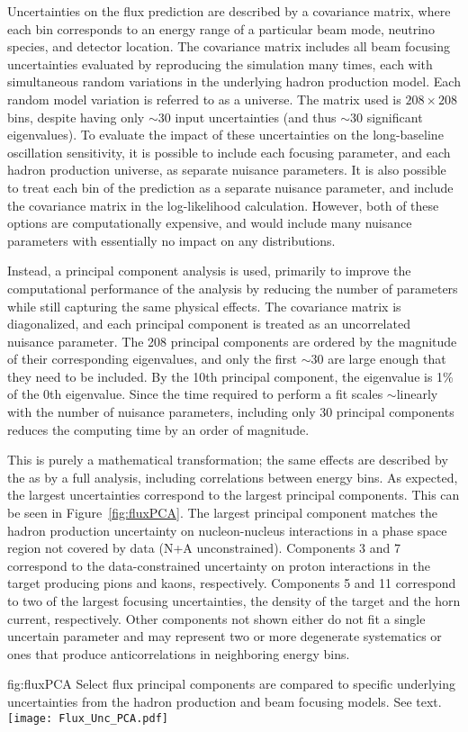 Uncertainties on the flux prediction are described by a covariance matrix, where each bin corresponds to an energy range of a particular beam mode, neutrino species, and detector location. The covariance matrix includes all beam focusing uncertainties evaluated by reproducing the simulation many times, each with simultaneous random variations in the underlying hadron production model. Each random model variation is referred to as a universe. The  matrix used is $208 \times 208$ bins, despite having only $\sim$30 input uncertainties (and thus $\sim$30 significant eigenvalues). To evaluate the impact of these uncertainties on the long-baseline oscillation sensitivity, it is possible to include each focusing parameter, and each hadron production universe, as separate nuisance parameters. It is also possible to treat each bin of the prediction as a separate nuisance parameter, and include the covariance matrix in the log-likelihood calculation. However, both of these options are computationally expensive, and would include many nuisance parameters with essentially no impact on any distributions.

Instead, a principal component analysis is used, primarily to improve the computational performance of the analysis by reducing the number of parameters while still capturing the same physical effects. The covariance matrix is diagonalized, and each principal component is treated as an uncorrelated nuisance parameter. The 208 principal components are ordered by the magnitude of their corresponding eigenvalues, and only the first $\sim$30 are large enough that they need to be included. By the 10th principal component, the eigenvalue is 1\% of the 0th eigenvalue. Since the time required to perform a fit scales $\sim$linearly with the number of nuisance parameters, including only 30 principal components reduces the computing time by an order of magnitude.

This is purely a mathematical transformation; the same effects are described by the  as by a full analysis, including correlations between energy bins. As expected, the largest uncertainties correspond to the largest principal components. This can be seen in Figure~\ref{fig:fluxPCA}. The largest principal component matches the hadron production uncertainty on nucleon-nucleus interactions in a phase space region not covered by data (N+A unconstrained). Components 3 and 7 correspond to the data-constrained uncertainty on proton interactions in the target producing pions and kaons, respectively. Components 5 and 11 correspond to two of the largest focusing uncertainties, the density of the target and the horn current, respectively. Other components not shown either do not fit a single uncertain parameter and may represent two or more degenerate systematics or ones that produce anticorrelations in neighboring energy bins.

\begin{dunefigure}{fig:fluxPCA}
{Select flux principal components are compared to specific underlying uncertainties from the hadron production and beam focusing models. See text. }
    \texttt{[image: Flux\_Unc\_PCA.pdf]}
\end{dunefigure}



